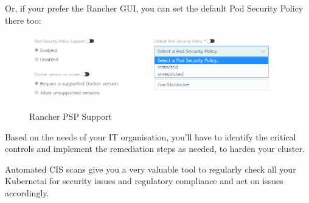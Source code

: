 Or, if your prefer the Rancher GUI, you can set the default Pod Security Policy there too:

\begin{figure}[H]
\centering
\caption {Rancher PSP Support}
\includegraphics[width=\linewidth]{images/rancher-psp-support.png}
\label{fig:rancherPSP}
\end{figure}

Based on the needs of your IT organisation, you'll have to identify the critical controls and implement the remediation steps as needed, to harden your cluster.

Automated CIS scans give you a very valuable tool to regularly check all your Kubernetai for security issues and regulatory compliance and act on issues accordingly.
